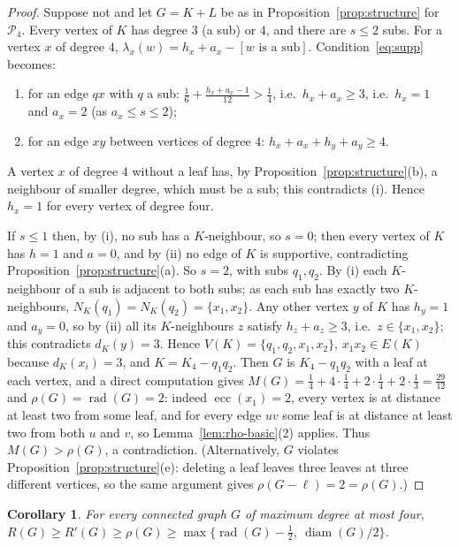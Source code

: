 \documentclass[11pt]{amsart}
\newtheorem{corollary}[theorem]{Corollary}
\theoremstyle{definition}
\newcommand{\rad}{\operatorname{rad}}
\newcommand{\diam}{\operatorname{diam}}
\newcommand{\ecc}{\operatorname{ecc}}
\newcommand{\Rp}{R'}
\begin{document}
\begin{proof}
Suppose not and let $G=K+L$ be as in Proposition~\ref{prop:structure} for $\mathcal P_4$. Every vertex of $K$ has
degree $3$ (a sub) or $4$, and there are $s\le2$ subs. For a vertex $x$ of degree $4$,
$\lambda_x(w)=h_x+a_x-[w\text{ is a sub}]$. Condition~\eqref{eq:supp} becomes:
\begin{enumerate}[label=(\roman*)]
\item for an edge $qx$ with $q$ a sub: $\frac16+\frac{h_x+a_x-1}{12}>\frac14$, i.e.\ $h_x+a_x\ge3$, i.e.\ $h_x=1$ and
      $a_x=2$ (as $a_x\le s\le2$);
\item for an edge $xy$ between vertices of degree $4$: $h_x+a_x+h_y+a_y\ge4$.
\end{enumerate}
A vertex $x$ of degree $4$ without a leaf has, by Proposition~\ref{prop:structure}(b), a neighbour of smaller degree,
which must be a sub; this contradicts (i). Hence $h_x=1$ for every vertex of degree four.

If $s\le1$ then, by (i), no sub has a $K$-neighbour, so $s=0$; then every vertex of $K$ has $h=1$ and $a=0$, and by
(ii) no edge of $K$ is supportive, contradicting Proposition~\ref{prop:structure}(a). So $s=2$, with subs $q_1,q_2$.
By (i) each $K$-neighbour of a sub is adjacent to both subs; as each sub has exactly two $K$-neighbours,
$N_K(q_1)=N_K(q_2)=\{x_1,x_2\}$. Any other vertex $y$ of $K$ has $h_y=1$ and $a_y=0$, so by (ii) all its
$K$-neighbours $z$ satisfy $h_z+a_z\ge3$, i.e.\ $z\in\{x_1,x_2\}$; this contradicts $d_K(y)=3$. Hence
$V(K)=\{q_1,q_2,x_1,x_2\}$, $x_1x_2\in E(K)$ because $d_K(x_i)=3$, and $K=K_4-q_1q_2$. Then $G$ is $K_4-q_1q_2$ with a
leaf at each vertex, and a direct computation gives $M(G)=\frac14+4\cdot\frac14+2\cdot\frac14+2\cdot\frac13=\frac{29}{12}$
and $\rho(G)=\rad(G)=2$: indeed $\ecc(x_1)=2$, every vertex is at distance at least two from some leaf, and for
every edge $uv$ some leaf is at distance at least two from both $u$ and $v$, so Lemma~\ref{lem:rho-basic}(2) applies.
Thus $M(G)>\rho(G)$, a contradiction. (Alternatively, $G$ violates Proposition~\ref{prop:structure}(e): deleting a
leaf leaves three leaves at three different vertices, so the same argument gives $\rho(G-\ell)=2=\rho(G)$.)
\end{proof}

\begin{corollary}\label{cor:D4}
For every connected graph $G$ of maximum degree at most four,
$R(G)\ge\Rp(G)\ge\rho(G)\ge\max\{\rad(G)-\frac12,\ \diam(G)/2\}$.
\end{corollary}
\end{document}
